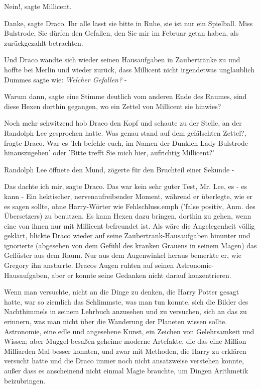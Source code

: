 \glqq{}Nein!\grqq{}, sagte Millicent.

\glqq{}Danke\grqq{}, sagte Draco. \glqq{}Ihr alle lasst sie bitte in Ruhe, sie ist
nur ein Spielball. Miss Bulstrode, Sie dürfen den Gefallen, den Sie mir im
Februar getan haben, als zurückgezahlt betrachten.\grqq{}

Und Draco wandte sich wieder seinen Hausaufgaben in Zaubertränke zu und hoffte
bei Merlin und wieder zurück, dass Millicent nicht irgendetwas unglaublich
Dummes sagte wie:\emph{ \glqq{}Welcher Gefallen?\grqq{}} -

\glqq{}Warum dann\grqq{}, sagte eine Stimme deutlich vom anderen Ende des Raumes,
\glqq{}sind diese Hexen dorthin gegangen, wo ein Zettel von Millicent sie
hinwies?\grqq{}

Noch mehr schwitzend hob Draco den Kopf und schaute zu der Stelle, an der
Randolph Lee gesprochen hatte. \glqq{}Was genau stand auf dem gefälschten
Zettel?\grqq{}, fragte Draco. \glqq{}War es 'Ich befehle euch, im Namen der
Dunklen Lady Bulstrode hinauszugehen' oder 'Bitte trefft Sie mich hier,
aufrichtig Millicent?'\grqq{}

Randolph Lee öffnete den Mund, zögerte für den Bruchteil einer Sekunde -

\glqq{}Das dachte ich mir\grqq{}, sagte Draco. \glqq{}Das war kein sehr guter
Test, Mr. Lee, es - es kann -\grqq{} Ein hektischer, nervenaufreibender Moment,
während er überlegte, wie er es sagen sollte, ohne Harry-Wörter wie \glqq{}
Fehlschluss\grqq{}.emph{ ('false positiv, Anm. des Übersetzers)} zu benutzen.
\glqq{}Es kann Hexen dazu bringen, dorthin zu gehen, wenn eine von ihnen nur mit
Millicent befreundet ist.\grqq{} Als wäre die Angelegenheit völlig geklärt,
blickte Draco wieder auf seine Zaubertrank-Hausaufgaben hinunter und ignorierte
(abgesehen von dem Gefühl des kranken Grauens in seinem Magen) das Geflüster aus
dem Raum. Nur aus dem Augenwinkel heraus bemerkte er, wie Gregory ihn anstarrte.
Dracos Augen ruhten auf seinen Astronomie-Hausaufgaben, aber er konnte seine
Gedanken nicht darauf konzentrieren.

Wenn man versuchte, nicht an die Dinge zu denken, die Harry Potter gesagt hatte,
war so ziemlich das Schlimmste, was man tun konnte, sich die Bilder des
Nachthimmels in seinem Lehrbuch anzusehen und zu versuchen, sich an das zu
erinnern, was man nicht über die Wanderung der Planeten wissen sollte.
Astronomie, eine edle und angesehene Kunst, ein Zeichen von Gelehrsamkeit und
Wissen; aber Muggel besaßen geheime moderne Artefakte, die das eine Million
Milliarden Mal besser konnten, und zwar mit Methoden, die Harry zu erklären
versucht hatte und die Draco immer noch nicht ansatzweise verstehen konnte,
außer dass es anscheinend nicht einmal Magie brauchte, um Dingen Arithmetik
beizubringen.

